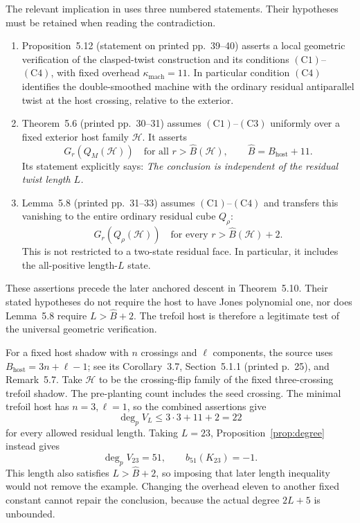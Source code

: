 \documentclass[11pt]{amsart}
\theoremstyle{remark}
\newcommand{\degp}{\deg_p}
\begin{document}
The relevant implication in \cite{CC} uses three
numbered statements. Their hypotheses must be
retained when reading the contradiction.
\begin{enumerate}
\item Proposition~5.12 (statement on printed
pp.~39--40) asserts a local geometric verification
of the clasped-twist construction and its
conditions \((\mathrm C1)\)--\((\mathrm C4)\),
with fixed overhead \(\kappa_{\mathrm{mach}}=11\).
In particular condition \((\mathrm C4)\)
identifies the double-smoothed machine with the
ordinary residual antiparallel twist at the
host crossing, relative to the exterior.

\item Theorem~5.6 (printed pp.~30--31) assumes
\((\mathrm C1)\)--\((\mathrm C3)\) uniformly
over a fixed exterior host family \(\mathcal H\).
It asserts
\[
 G_r(Q_M(\mathcal H))\quad\text{for all }r>\widehat B(\mathcal H),
 \qquad \widehat B=B_{\mathrm{host}}+11.
\]
Its statement explicitly says:
\emph{The conclusion is independent of the
residual twist length \(L\).}

\item Lemma~5.8 (printed pp.~31--33) assumes
\((\mathrm C1)\)--\((\mathrm C4)\) and transfers
this vanishing to the entire ordinary residual
cube \(Q_\rho\):
\begin{equation}\label{eq:claimed}
 G_r(Q_\rho(\mathcal H))\quad
 \text{for every }r>\widehat B(\mathcal H)+2.
\end{equation}
This is not restricted to a two-state residual
face. In particular, it includes the all-positive
length-\(L\) state.
\end{enumerate}

These assertions precede the later anchored
descent in Theorem~5.10. Their stated hypotheses
do not require the host to have Jones polynomial
one, nor does Lemma~5.8 require
\(L>\widehat B+2\). The trefoil host is therefore
a legitimate test of the universal geometric
verification.

For a fixed host shadow with \(n\) crossings
and \(\ell\) components, the source uses
\(B_{\mathrm{host}}=3n+\ell-1\);
see its Corollary~3.7, Section~5.1.1
(printed p.~25), and Remark~5.7.
Take \(\mathcal H\) to be the crossing-flip family
of the fixed three-crossing trefoil shadow.
The pre-planting count includes the seed crossing.
The minimal trefoil host has \(n=3,\ell=1\),
so the combined assertions give
\begin{equation}\label{eq:cap22}
 \degp V_L\le3\cdot3+11+2=22
\end{equation}
for every allowed residual length.
Taking \(L=23\), Proposition~\ref{prop:degree}
instead gives
\begin{equation}\label{eq:contradiction}
 \degp V_{23}=51,\qquad b_{51}(K_{23})=-1.
\end{equation}
This length also satisfies \(L>\widehat B+2\),
so imposing that later length inequality would
not remove the example. Changing the overhead
eleven to another fixed constant cannot repair
the conclusion, because the actual degree
\(2L+5\) is unbounded.
\end{document}
